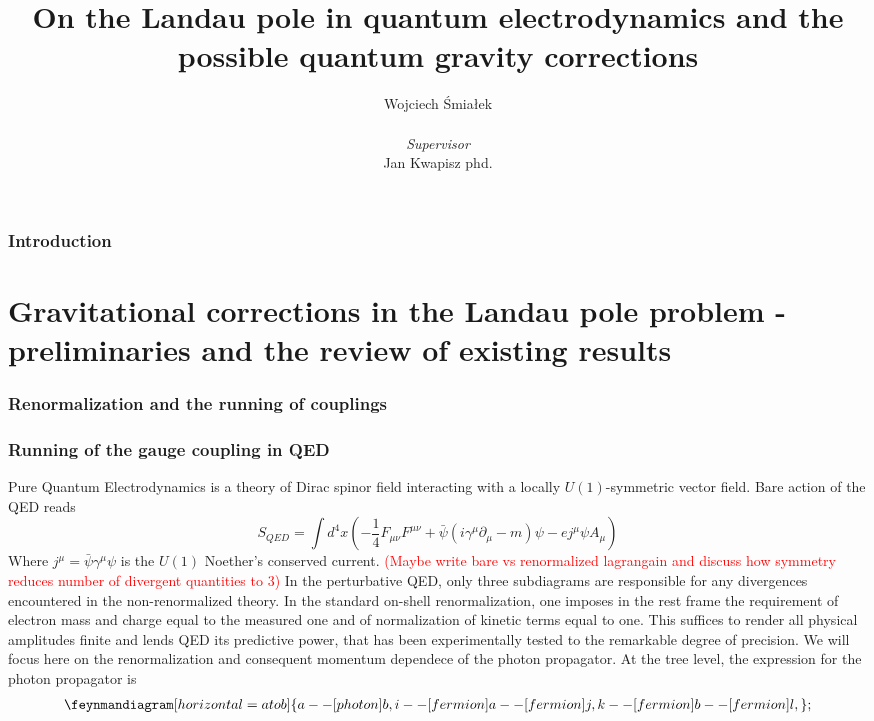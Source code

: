 \documentclass[11pt, a4paper]{article}
\title{\vspace{-2cm}On the Landau pole in quantum electrodynamics and the possible quantum gravity corrections}
\author{{Wojciech Śmiałek}\\
\\
{\textit{Supervisor}} \\
{Jan Kwapisz phd.}}
\date{}
\begin{document}
\maketitle

\section*{Introduction}

\part{Gravitational corrections in the Landau pole problem - preliminaries and the review of existing results}

\section{Renormalization and the running of couplings}

\section{Running of the gauge coupling in QED}

Pure Quantum Electrodynamics is a theory of Dirac spinor field interacting with a locally $U(1)$-symmetric vector field.
Bare action of the QED reads
\begin{equation}
    S_{QED} = \int d^4 x \left( -\frac{1}{4}F_{\mu\nu}F^{\mu\nu} + \bar{\psi}(i \gamma^\mu \partial_\mu - m)\psi - e j^\mu \psi A_\mu \right)
\end{equation}
Where $j^\mu = \bar \psi \gamma^\mu \psi$ is the $U(1)$ Noether's conserved current.
\textcolor{red}{(Maybe write bare vs renormalized lagrangain and discuss how symmetry reduces number of divergent quantities to 3)}
In the perturbative QED, only three subdiagrams are responsible for any divergences encountered in the non-renormalized
theory. In the standard on-shell renormalization, one imposes in the rest frame the requirement of electron mass and charge
equal to the measured one and of normalization of kinetic terms equal to one. This suffices to render all
physical amplitudes finite and lends QED its predictive power, that has been experimentally tested
to the remarkable degree of precision.
We will focus here on the renormalization and consequent momentum dependece of the photon propagator.
At the tree level, the expression for the photon propagator is
\begin{equation*}
\begin{aligned}
\feynmandiagram [horizontal=a to b] {
a -- [photon] b,
i -- [fermion] a -- [fermion] j,
k -- [fermion] b -- [fermion] l,
};
\end{aligned}
\end{equation*}
\end{document}
